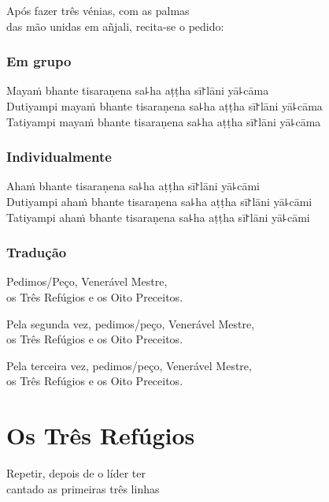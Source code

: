 \begin{instruction}
  Após fazer três vénias, com as palmas\\
  das mão unidas em añjali, recita-se o pedido:
\end{instruction}

\subsection{Em grupo}

Mayaṁ bhante tisaraṇena sa꜕ha aṭṭha sī꜓lāni yā꜕cāma\\
Dutiyampi mayaṁ bhante tisaraṇena sa꜕ha aṭṭha sī꜓lāni yā꜕cāma\\
Tatiyampi mayaṁ bhante tisaraṇena sa꜕ha aṭṭha sī꜓lāni yā꜕cāma

\subsection{Individualmente}

Ahaṁ bhante tisaraṇena sa꜕ha aṭṭha sī꜓lāni yā꜕cāmi\\
Dutiyampi ahaṁ bhante tisaraṇena sa꜕ha aṭṭha sī꜓lāni yā꜕cāmi\\
Tatiyampi ahaṁ bhante tisaraṇena sa꜕ha aṭṭha sī꜓lāni yā꜕cāmi

\subsection{Tradução}

\begin{english}
  Pedimos/Peço, Venerável Mestre,\\
  \vin os Três Refúgios e os Oito Preceitos.

  Pela segunda vez, pedimos/peço, Venerável Mestre,\\
  \vin os Três Refúgios e os Oito Preceitos.

  Pela terceira vez, pedimos/peço, Venerável Mestre,\\
  \vin os Três Refúgios e os Oito Preceitos.
\end{english}

\clearpage
\chapter{Os Três Refúgios}

\begin{instruction}
  Repetir, depois de o líder ter\\
  cantado as primeiras três linhas
\end{instruction}

